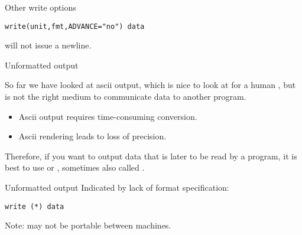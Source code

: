  {Other write options}

\begin{verbatim}
write(unit,fmt,ADVANCE="no") data
\end{verbatim}
will not issue a newline.

 

 {Unformatted output}
\label{sec:rawdataf}

So far we have looked at ascii output, which is nice to look at for a
human , but is not the right medium to communicate data to another
program.
\begin{itemize}
\item Ascii output requires time-consuming conversion.
\item Ascii rendering leads to loss of precision.
\end{itemize}
Therefore, if you want to output data that is later to be read by a
program, it is best to use  or
, sometimes also called
.

\begin{block}{Unformatted output}
  Indicated by lack of format specification:
\begin{verbatim}
write (*) data
\end{verbatim}
  Note: may not be portable between machines.
\end{block}
